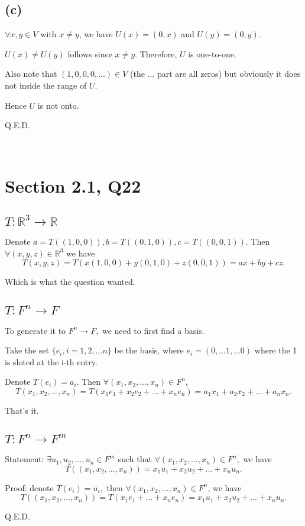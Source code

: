 \documentclass[12pt]{article}%
\begin{document}
\subsection{(c)}

$\forall x,y\in V$ with $x \neq y$, we have $U(x)=(0,x)$ and $U(y)=(0,y).$ 

$U(x)\neq U(y)$ follows since $x\neq y. $ Therefore, $U$ is one-to-one. 

Also note that $(1,0,0,0,...)\in V$ (the ... part are all zeros) but obviously it does not inside the range of $U$. 

Hence $U$ is not onto. 

Q.E.D.

~ \ 

\section{Section 2.1, Q22}

\subsection{$T:\mathbb{R}^3 \to \mathbb{R}$}

Denote $a=T((1,0,0)),b=T((0,1,0)),c=T((0,0,1)).$ Then $\forall (x,y,z)\in \mathbb{R}^3$ we have $$T(x,y,z)=T(x(1,0,0)+y(0,1,0)+z(0,0,1))=ax+by+cz.$$

Which is what the question wanted. 

\subsection{$T:F^n \to F$}

To generate it to $F^n \to F,$ we need to first find a basis. 

Take the set $\{e_i,i=1,2,...n\}$ be the basis, where $e_i=(0,...1,...0)$ where the 1 is sloted at the i-th entry. 

Denote $T(e_i)=a_i.$ Then $\forall (x_1,x_2,...,x_n)\in F^n,$ $$T(x_1,x_2,...,x_n)=T(x_1e_1+x_2e_2+...+x_ne_n)=a_1x_1+a_2x_2+...+a_nx_n.$$

That's it. 

\subsection{$T:F^n \to F^m$}

Statement: $\exists u_1,u_2,...,u_n \in F^m$ such that $\forall (x_1,x_2,...,x_n)\in F^n,$ we have $$T((x_1,x_2,...,x_n))=x_1u_1+x_2u_2+...+x_nu_n.$$


Proof: denote $T(e_i)=u_i,$ then $\forall (x_1,x_2,...,x_n)\in F^n$, we have $$T((x_1,x_2,...,x_n))=T(x_1e_1+...+x_ne_n)=x_1u_1+x_2u_2+...+x_nu_n.$$

Q.E.D.
\end{document}
